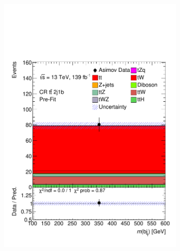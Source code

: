 \begin{figure}[!h]
\begin{subfigure}[b]{0.33\linewidth}
    \includegraphics[width=\textwidth]{ubonn-thesis/Chapters/Chapters_07/Figure/Asmiov/CR_2j1b.pdf} 
    \caption{}
  \end{subfigure} 
  \centering
  \begin{subfigure}[b]{0.33\linewidth}

\end{subfigure}
\end{figure}
